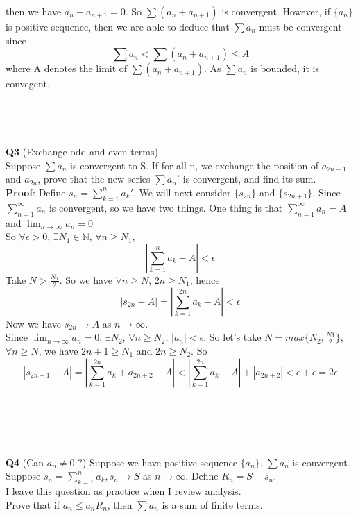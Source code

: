 \documentclass{article}
\begin{document}
then we have $a_n + a_{n+1} = 0$. So $\sum (a_n + a_{n+1})$ is convergent.
However, if $\{a_n\}$ is positive sequence, then we are able to deduce that $\sum a_n$ 
must be convergent since 
$$
\sum a_n < \sum (a_n + a_{n+1}) \leq A
$$
where A denotes the limit of $\sum (a_n + a_{n+1})$. As $\sum a_n$ is bounded, it is 
convegent.
\\
\\
\\
\\
\\
\textbf{Q3} (Exchange odd and even terms)\\
Suppose $\sum a_n$ is convergent to S. If for all n, we exchange the position of
$a_{2n-1}$ and $a_{2n}$, prove that the new series 
$\sum a_n'$ is convergent, and find its sum.\\
\textbf{Proof}: Define $s_{n} = \sum_{k=1}^{n} a_k'$. We will next consider $\{s_{2n}\}$ and $\{s_{2n+1}\}$. Since $\sum_{n=1}^{\infty} a_n$ is convergent, so we have two things. One thing 
is that $\sum_{n=1}^{\infty} a_n = A$ and $\lim_{n \to \infty} a_n = 0$\\
So $\forall \epsilon > 0 $, $\exists N_1 \in \mathbb{N}$, $\forall n \geq N_1$,
$$
\left | \sum_{k=1}^{n} a_k - A \right | < \epsilon
$$
Take $N > \frac{N_1}{2}$. So we have $\forall n \geq N$, $2n \geq N_1$, hence
$$
\left | s_{2n} - A \right | = \left | \sum_{k=1}^{2n} a_k - A\right | < \epsilon
$$
Now we have $s_{2n} \rightarrow A$ as $n \rightarrow \infty$.\\
Since $\lim_{n \to \infty} a_n = 0$, $\exists N_2$, $\forall n \geq N_2$, $\left | a_n \right | < \epsilon$.
So let's take $N = max \{N_2,\frac{N1}{2}\}$, $\forall n \geq N$, we have $2n+1 \geq N_1$ and $2n \geq N_2$. So 
$$
\left | s_{2n+1} - A \right | = \left | \sum_{k=1}^{2n} a_k + a_{2n+2} - A \right | < \left | \sum_{k=1}^{2n} a_k - A \right | + \left | a_{2n+2} \right | < \epsilon + \epsilon = 2\epsilon
$$
\\
\\
\\
\\
\\
\textbf{Q4} (Can $a_n \ne 0$ ?)
Suppose we have positive sequence $\{a_n\}$. $\sum a_n$ is convergent. Suppose $s_n = \sum_{k=1}^{n} a_k, s_n \rightarrow S$ as $n \rightarrow \infty$.
Define $R_n = S - s_n$.\\
I leave this question as practice when I review analysis.\\
Prove that if $a_n \leq a_n R_n $, then $\sum a_n$ is a sum of finite terms.
\\
\\
\\
\\
\\
\end{document}
